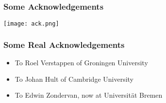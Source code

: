 \documentclass[11pt,table,final,fleqn,xcolor={usenames,dvipsnames},handout]{beamer}
\begin{document}
\begin{frame}
 \frametitle{Some Acknowledgements}
 \centering\texttt{[image: ack.png]}
\end{frame}

\begin{frame}
 \frametitle{Some Real Acknowledgements}
 \begin{itemize}
  \item To Roel Verstappen of Groningen University
  \item To Johan Hult of Cambridge University
  \item To Edwin Zondervan, now at Universit\"at Bremen
 \end{itemize}
\end{frame}
\end{document}
